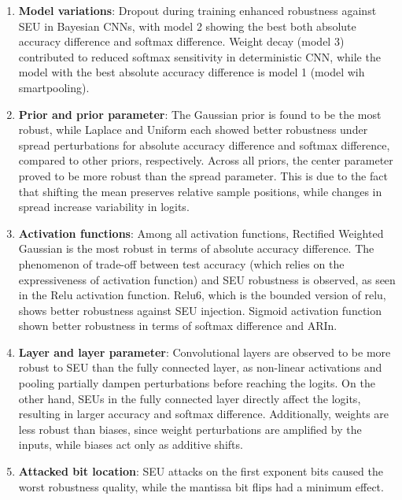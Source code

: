 \documentclass[ %
                    author={Revalda Putawara},
                supervisor={Dr. James Pope},
                    degree={MSc},
                     title={Robustness of Bayesian Neural Networks Design Choices Against Weight and Bias Perturbation Induced by Single Event Upsets (SEUs)},
                      type={},
                      year={2025}]{dissertation}
\begin{document}
\begin{enumerate}
\item \textbf{Model variations}: Dropout during training enhanced robustness against SEU in Bayesian CNNs, with model 2 showing the best both absolute accuracy difference and softmax difference. Weight decay (model 3) contributed to reduced softmax sensitivity in deterministic CNN, while the model with the best absolute accuracy difference is model 1 (model wih smartpooling).
\item \textbf{Prior and prior parameter}: The Gaussian prior is found to be the most robust, while Laplace and Uniform each showed better robustness under spread perturbations for absolute accuracy difference and softmax difference, compared to other priors, respectively. Across all priors, the center parameter proved to be more robust than the spread parameter. This is due to the fact that shifting the mean preserves relative sample positions, while changes in spread increase variability in logits.
\item \textbf{Activation functions}: Among all activation functions, Rectified Weighted Gaussian is the most robust in terms of absolute accuracy difference. The phenomenon of trade-off between test accuracy (which relies on the expressiveness of activation function) and SEU robustness is observed, as seen in the Relu activation function. Relu6, which is the bounded version of relu, shows better robustness against SEU injection. Sigmoid activation function shown better robustness in terms of softmax difference and ARIn.
\item \textbf{Layer and layer parameter}: Convolutional layers are observed to be more robust to SEU than the fully connected layer, as non-linear activations and pooling partially dampen perturbations before reaching the logits. On the other hand, SEUs in the fully connected layer directly affect the logits, resulting in larger accuracy and softmax difference. Additionally, weights are less robust than biases, since weight perturbations are amplified by the inputs, while biases act only as additive shifts.
\item \textbf{Attacked bit location}: SEU attacks on the first exponent bits caused the worst robustness quality, while the mantissa bit flips had a minimum effect.

\end{enumerate}
\end{document}
